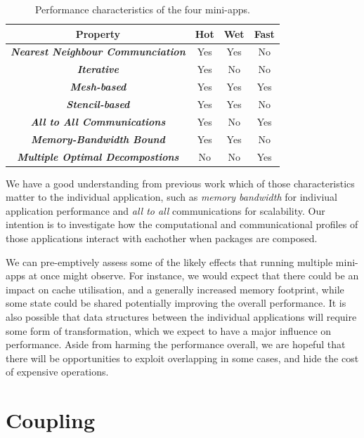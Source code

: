 \documentclass[runningheads,a4paper]{llncs}
\begin{document}
\begin{table}[h]
  \begin{center}
    \begin{tabular}{cccc}
      \hline
      \textbf{Property} & \textbf{Hot} & \textbf{Wet} & \textbf{Fast} \\
      \hline
      \textit{\textbf{Nearest Neighbour Communciation}} & Yes & Yes & No  \\
      \textit{\textbf{Iterative}} & Yes & No & No \\
      \textit{\textbf{Mesh-based}} & Yes & Yes & Yes \\
      \textit{\textbf{Stencil-based}} & Yes & Yes & No \\
      \textit{\textbf{All to All Communications}} & Yes & No & Yes \\
      \textit{\textbf{Memory-Bandwidth Bound}} & Yes & Yes & No \\
      \textit{\textbf{Multiple Optimal Decompostions}} & No & No & Yes \\
    \end{tabular}
  \end{center}
  \caption{Performance characteristics of the four mini-apps.}
  \label{tab:perf-char-mini-apps}
\end{table}

We have a good understanding from previous work which of those characteristics matter to the individual application, such as \textit{memory bandwidth} for indiviual application performance and \textit{all to all} communications for scalability. Our intention is to investigate how the computational and communicational profiles of those applications interact with eachother when packages are composed.

We can pre-emptively assess some of the likely effects that running multiple mini-apps at once might observe. For instance, we would expect that there could be an impact on cache utilisation, and a generally increased memory footprint, while some state could be shared potentially improving the overall performance. It is also possible that data structures between the individual applications will require some form of transformation, which we expect to have a major influence on performance. Aside from harming the performance overall, we are hopeful that there will be opportunities to exploit overlapping in some cases, and hide the cost of expensive operations.

\section{Coupling}
\end{document}
